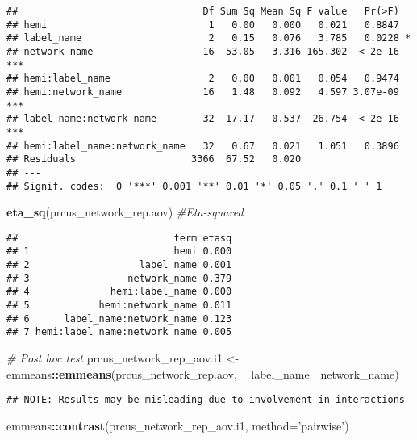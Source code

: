 \documentclass[
]{article}
\newenvironment{Shaded}{\begin{snugshade}}{\end{snugshade}}
\newcommand{\CommentTok}[1]{\textcolor[rgb]{0.56,0.35,0.01}{\textit{#1}}}
\newcommand{\DataTypeTok}[1]{\textcolor[rgb]{0.13,0.29,0.53}{#1}}
\newcommand{\KeywordTok}[1]{\textcolor[rgb]{0.13,0.29,0.53}{\textbf{#1}}}
\newcommand{\NormalTok}[1]{#1}
\newcommand{\OperatorTok}[1]{\textcolor[rgb]{0.81,0.36,0.00}{\textbf{#1}}}
\newcommand{\StringTok}[1]{\textcolor[rgb]{0.31,0.60,0.02}{#1}}
\begin{document}
\begin{verbatim}
##                                Df Sum Sq Mean Sq F value   Pr(>F)    
## hemi                            1   0.00   0.000   0.021   0.8847    
## label_name                      2   0.15   0.076   3.785   0.0228 *  
## network_name                   16  53.05   3.316 165.302  < 2e-16 ***
## hemi:label_name                 2   0.00   0.001   0.054   0.9474    
## hemi:network_name              16   1.48   0.092   4.597 3.07e-09 ***
## label_name:network_name        32  17.17   0.537  26.754  < 2e-16 ***
## hemi:label_name:network_name   32   0.67   0.021   1.051   0.3896    
## Residuals                    3366  67.52   0.020                     
## ---
## Signif. codes:  0 '***' 0.001 '**' 0.01 '*' 0.05 '.' 0.1 ' ' 1
\end{verbatim}

\begin{Shaded}
\begin{Highlighting}[]
\KeywordTok{eta_sq}\NormalTok{(prcus_network_rep.aov) }\CommentTok{#Eta-squared}
\end{Highlighting}
\end{Shaded}

\begin{verbatim}
##                           term etasq
## 1                         hemi 0.000
## 2                   label_name 0.001
## 3                 network_name 0.379
## 4              hemi:label_name 0.000
## 5            hemi:network_name 0.011
## 6      label_name:network_name 0.123
## 7 hemi:label_name:network_name 0.005
\end{verbatim}

\begin{Shaded}
\begin{Highlighting}[]
\CommentTok{# Post hoc test}
\NormalTok{prcus_network_rep_aov.i1 <-}\StringTok{ }\NormalTok{emmeans}\OperatorTok{::}\KeywordTok{emmeans}\NormalTok{(prcus_network_rep.aov, }\OperatorTok{~}\StringTok{ }\NormalTok{label_name }\OperatorTok{|}\StringTok{ }\NormalTok{network_name)}
\end{Highlighting}
\end{Shaded}

\begin{verbatim}
## NOTE: Results may be misleading due to involvement in interactions
\end{verbatim}

\begin{Shaded}
\begin{Highlighting}[]
\NormalTok{emmeans}\OperatorTok{::}\KeywordTok{contrast}\NormalTok{(prcus_network_rep_aov.i1, }\DataTypeTok{method=}\StringTok{'pairwise'}\NormalTok{)}
\end{Highlighting}
\end{Shaded}
\end{document}
